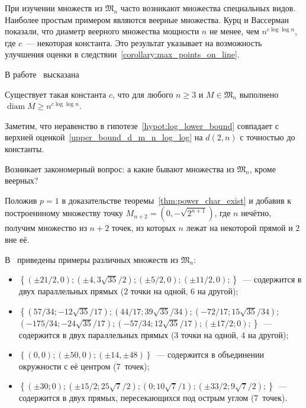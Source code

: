 При изучении множеств из $\mathfrak{M}_n$ часто возникают множества специальных видов.
Наиболее простым примером являются веерные множества.
Курц и Вассерман~\cite{kurz2008minimum} показали, что диаметр веерного множества мощности $n$
не менее, чем $n^{c \log \log n}$, где $c$~--- некоторая константа.
Это результат указывает на возможность улучшения оценки в следствии~\ref{corollary:max_points_on_line}.

В работе~\cite{kurz2008minimum} высказана
\begin{hypothesis}
	\label{hypot:log_lower_bound}
	Существует такая константа $c$,
	что для любого $n\geq 3$ и $M\in\mathfrak{M}_n$ выполнено
	$\operatorname{diam} M \geq n^{c \log \log n}$.
\end{hypothesis}

Заметим, что неравенство в гипотезе~\ref{hypot:log_lower_bound}
совпадает с верхней оценкой~\eqref{upper_bound_d_m_n_log_log} на $d(2,n)$
с точностью до константы.


Возникает закономерный вопрос: а какие бывают множества из $\mathfrak{M}_n$,
кроме веерных?

Положив $p=1$ в доказательстве теоремы~\ref{thm:power_char_exist} и добавив к построеннному множеству
точку $M_{n+2} = (0, -\sqrt{2^{n+1}})$, где $n$ нечётно,
получим множество из $n+2$ точек, из которых $n$ лежат на некоторой прямой и 2 вне её.

В~\cite{our-vvmsh-2018} приведены примеры различных множеств из $\mathfrak{M}_n$:
\begin{itemize}
	\item
		$
		\left\{
		(\pm 21/2, 0);
		(\pm 4, 3\sqrt{35}/2);
		(\pm 5/2, 0);
		(\pm 11/2, 0);
		\right\}
		$~---
		содержится в двух параллельных прямых (2 точки на одной, 6 на другой);



	\item
		$
		\left\{
		\left( {57/34} ; -{12\sqrt{35}/17}\right);
		\left( {44/17} ; {39\sqrt{35}/34}\right);
		\left( -{72/17} ;
		{15\sqrt{35}/34}\right);
		\right.$ \\ $\left.
		\left( -{175/34} ; -{24\sqrt{35}/17}\right);
		\left( -{57/34} ; {12\sqrt{35}/17}\right);
		\left( \pm{17/2} ; 0\right);
		\right\}
		$~---
		содержится в двух параллельных прямых (3 точки на одной, 4 на другой);

	\item
		$
		\left\{
		(0,0);(\pm 50, 0); (\pm 14, \pm 48)
		\right\}
		$~---
		содержится в объединении окружности с её центром (7~точек);

	\item
		$
		\left\{
		\left( \pm30 ; 0\right);
		\left( \pm{15/2} ; {25\sqrt{7}/2}\right);
		\left( 0 ; {10\sqrt{7}/1}\right);
		\left( \pm{33/2} ; {9\sqrt{7}/2}\right);
		\right\}
		$~---
		содержится в двух прямых, пересекающихся под острым углом (7~точек).
\end{itemize}


